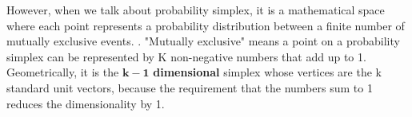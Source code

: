 \documentclass[11pt]{article}
\begin{document}
However, when we talk about probability simplex, it is a mathematical space where each point represents a probability distribution between a finite number of mutually exclusive events. \cite{prob_simplex}. "Mutually exclusive" means a point on a probability simplex can be represented by K non-negative numbers that add up to 1. Geometrically, it is the $\mathbf{k-1}$ \textbf{dimensional} simplex whose vertices are the k standard unit vectors, because the requirement that the numbers sum to 1 reduces the dimensionality by 1.
\end{document}
